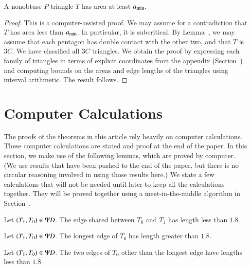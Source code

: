 \begin{lemma}  
A nonobtuse $P$-triangle $T$ has area at least $a_\text{min}$.
\end{lemma}

\begin{proof} 
  This is a computer-assisted proof.  We may assume for a contradiction
  that $T$ has area less than $a_\text{min}$.  In particular, it is
  subcritical.  By Lemma~, we may assume that each
  pentagon has double contact with the other two, and that $T$ is
  $3C$.  We have classified all $3C$ triangles.  We obtain the proof
  by expressing each family of triangles in terms of explicit
  coordinates from the appendix (Section~) and
  computing bounds on the areas and edge lengths of the triangles
  using interval arithmetic.  The result follows.
\end{proof}

\section{Computer Calculations}

The proofs of the theorems in this article rely heavily on computer calculations.
These computer calculations are stated and proof at the end of the paper.
In this section, we make use of the following lemmas, which are proved by
computer.  (We use results that have been pushed to the end of the paper, but
there is no circular reasoning involved in using those results here.)  We state
a few calculations that will not be needed until later to keep all  the calculations
together.  They will be proved together using a meet-in-the-middle algorithm in
Section~.

\begin{lemma}  
Let $(T_1,T_0)\in \Psi D$.  The edge shared between
$T_0$ and $T_1$ has length less than $1.8$. 
\end{lemma}

\begin{lemma} 
Let $(T_1,T_0)\in \Psi D$.  The longest edge of $T_0$
has length greater than $1.8$.
\end{lemma}

\begin{lemma}  
  Let $(T_1,T_0)\in \Psi D$.  The two edges of $T_0$ other than the
  longest edge have lengths less than $1.8$.
\end{lemma}

